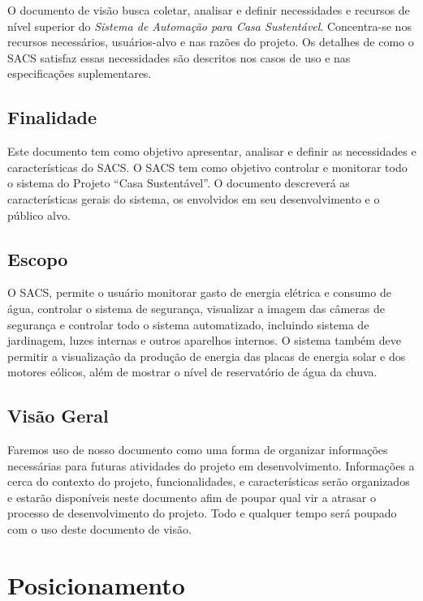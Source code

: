 	O documento de visão busca coletar, analisar e definir necessidades e recursos de nível superior do \textit{Sistema de Automação para Casa Sustentável}. Concentra-se nos recursos necessários, usuários-alvo e nas razões do projeto. Os detalhes de como o SACS satisfaz essas necessidades são descritos nos casos de uso e nas especificações suplementares.

\subsection{Finalidade}

	Este documento tem como objetivo apresentar, analisar e definir as necessidades e características do SACS. O SACS tem como objetivo controlar e monitorar todo o sistema do Projeto “Casa Sustentável”. O documento descreverá as características gerais do sistema, os envolvidos em seu desenvolvimento e o público alvo.


\subsection{Escopo}

	O SACS, permite o usuário monitorar gasto de energia elétrica e consumo de água, controlar o sistema de segurança, visualizar a imagem das câmeras de segurança e controlar todo o sistema automatizado, incluindo sistema de jardinagem, luzes internas e outros aparelhos internos. O sistema também deve permitir a visualização da produção de energia das placas de energia solar e dos motores eólicos, além de mostrar o nível de reservatório de água da chuva.

\subsection{Visão Geral}

	Faremos uso de nosso documento como uma forma de organizar informações necessárias para futuras atividades do projeto em desenvolvimento. Informações a cerca do contexto do projeto, funcionalidades, e características serão organizados e estarão disponíveis neste documento afim de poupar qual vir a atrasar o processo de desenvolvimento do projeto. Todo e qualquer tempo será poupado com o uso deste documento de visão.

\section{Posicionamento}

